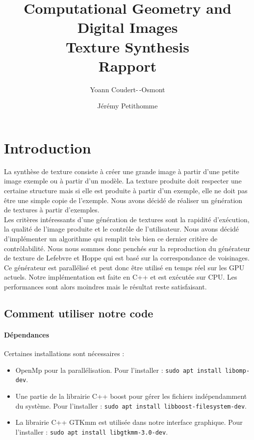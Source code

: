 \documentclass[12pt]{article}
\title{
	Computational Geometry and Digital Images\\
	\textbf{Texture Synthesis}\\
	Rapport
}
\author{
	Yoann Coudert-\,-Osmont
	\and
	Jérémy Petithomme
}
\begin{document}
	
\maketitle

\section{Introduction}
	
La synthèse de texture consiste à créer une grande image à partir d'une petite image exemple ou à partir d'un modèle. La texture produite doit respecter une certaine structure mais si elle est produite à partir d'un exemple, elle ne doit pas être une simple copie de l'exemple. Nous avons décidé de réaliser un génération de textures à partir d'exemples. \\
Les critères intéressants d'une génération de textures sont la rapidité d'exécution, la qualité de l'image produite et le contrôle de l'utilisateur. Nous avons décidé d'implémenter un algorithme qui remplit très bien ce dernier critère de contrôlabilité. Nous nous sommes donc penchés sur la reproduction du générateur de texture de Lefebvre et Hoppe \cite{Lef++} qui est basé sur la correspondance de voisinages. Ce générateur est parallélisé et peut donc être utilisé en temps réel sur les GPU actuels. Notre implémentation est faite en C++ et est exécutée sur CPU. Les performances sont alors moindres mais le résultat reste satisfaisant.

\subsection{Comment utiliser notre code}

\paragraph{Dépendances}
Certaines installations sont nécessaires :
\begin{itemize}
	\item OpenMp pour la parallélisation. Pour l'installer : \verb|sudo apt install libomp-dev|.
	\item Une partie de la librairie C++ boost pour gérer les fichiers indépendamment du système. Pour l'installer : \verb|sudo apt install libboost-filesystem-dev|.
	\item La librairie C++ GTKmm est utilisée dans notre interface graphique. Pour l'installer : \verb|sudo apt install libgtkmm-3.0-dev|.
\end{itemize}
\end{document}
